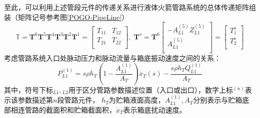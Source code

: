 至此，可以利用上述管段元件的传递关系进行液体火箭管路系统的总体传递矩阵组装（矩阵记号参考图\ref{POGO-PipeLine}）
\begin{equation}
  \boldsymbol{\mathbb{T}}=\boldsymbol{T}^6\boldsymbol{T}^5\boldsymbol{T}^4\boldsymbol{T}^3\boldsymbol{T}^2\boldsymbol{T}^1=\left[ \begin{matrix}
      {T}_{11} & {T}_{12} \\
      {T}_{21} & {T}_{22} \\
    \end{matrix} \right],\;
  \boldsymbol{T}^s=\boldsymbol{T}^6 \left[
    \begin{matrix}
      -A_{L1}^{(5)}Z_{L1}^{(5)} \\
      A_{L1}^{(5)}              \\
    \end{matrix} \right] = \left[ \begin{matrix}
      {T}_{1}^s \\
      {T}_{2}^s \\
    \end{matrix} \right]
\end{equation}
考虑管路系统入口处脉动压力和脉动流量与箱底振动速度之间的关系：
\begin{equation}
  \label{eq:Inlet-Boundary-Condition}
  P_{L1}^{(1)}=s\rho{h}_T\left(1-\frac{A_{L1}^{(1)}}{A_T}\right){\dot{x}_T}(s)- \frac{s\rho{h_T}Q_{L1}^{(1)}}{A_T}
\end{equation}
其中，符号下标${}_{L1},{}_{L2}$用于区分管路参数描述位置（入口或出口），数字上标${}^{(n)}$表示该参数描述第$n$段管路元件， $h_T$为贮箱液面高度，$A_{L1}^{(1)}, A_T$分别表示与贮箱底部相连管路的截面积和贮箱截面积，$\dot{x}_T$表示箱底扰动速度。

